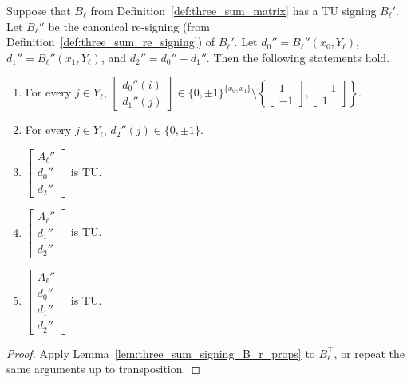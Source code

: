 \begin{lemma}\label{lem:three_sum_signing_B_l_props}
    Suppose that $B_{\ell}$ from Definition~\ref{def:three_sum_matrix} has a TU signing $B_{\ell}'$. Let $B_{\ell}''$ be the canonical re-signing (from Definition~\ref{def:three_sum_re_signing}) of $B_{\ell}'$. Let $d_{0}'' = B_{\ell}'' (x_{0}, Y_{\ell})$, $d_{1}'' = B_{\ell}'' (x_{1}, Y_{\ell})$, and $d_{2}'' = d_{0}'' - d_{1}''$. Then the following statements hold.
    \begin{enumerate}
        \item\label{item:tss_Blp_d01} For every $j \in Y_{\ell}$, $\begin{bmatrix} d_{0}'' (i) \\ d_{1}'' (j) \end{bmatrix} \in \{0, \pm 1\}^{\{x_{0}, x_{1}\}} \setminus \left\{ \begin{bmatrix} 1 \\ -1 \end{bmatrix}, \begin{bmatrix} -1 \\ 1 \end{bmatrix} \right\}$.
        \item\label{item:tss_Blp_d2} For every $j \in Y_{\ell}$, $d_{2}'' (j) \in \{0, \pm 1\}$.
        \item\label{item:tss_Blp_tu1} $\begin{bmatrix} A_{\ell}'' \\ d_{0}'' \\ d_{2}'' \end{bmatrix}$ is TU.
        \item\label{item:tss_Blp_tu2} $\begin{bmatrix} A_{\ell}'' \\ d_{1}'' \\ d_{2}'' \end{bmatrix}$ is TU.
        \item\label{item:tss_Blp_tu3} $\begin{bmatrix} A_{\ell}'' \\ d_{0}'' \\ d_{1}'' \\ d_{2}'' \end{bmatrix}$ is TU.
    \end{enumerate}
\end{lemma}

\begin{proof}
    Apply Lemma~\ref{lem:three_sum_signing_B_r_props} to $B_{\ell}^{\top}$, or repeat the same arguments up to transposition.
\end{proof}

